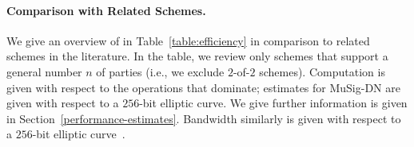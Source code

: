 \begin{table}[t]
	\centering
  \medskip
	\caption{ Comparison of multi-party deterministic Schnorr signature schemes
  in the ROM that support general choices of $n$.
  }
\label{table:efficiency}
\end{table}



\paragraph{\bf Comparison with Related Schemes.}
We give an overview of \glitter in Table~\ref{table:efficiency} in comparison to related
schemes in the literature.
In the table,
we review only schemes that support a general number $n$ of parties (i.e., we exclude $2$-of-$2$ schemes).
Computation is given with respect to the operations that dominate;
estimates for MuSig-DN are given with respect to a $256$-bit elliptic curve.
We give further information is given in Section~\ref{performance-estimates}.
Bandwidth similarly is given with respect to a $256$-bit elliptic curve~\cite{NickRSW20,GarillotKMN21}.

